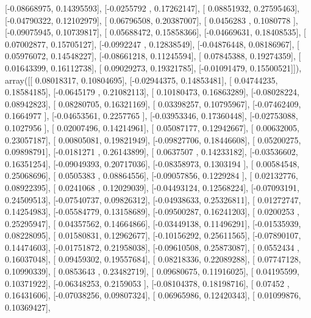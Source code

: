 \documentclass{article}
\begin{document}
       [-0.08668975,  0.14395593],
       [-0.0255792 ,  0.17262147],
       [ 0.08851932,  0.27595463],
       [-0.04790322,  0.12102979],
       [ 0.06796508,  0.20387007],
       [ 0.0456283 ,  0.1080778 ],
       [-0.09075945,  0.10739817],
       [ 0.05688472,  0.15858366],
       [-0.04669631,  0.18408535],
       [ 0.07002877,  0.15705127],
       [-0.0992247 ,  0.12838549],
       [-0.04876448,  0.08186967],
       [ 0.05976072,  0.14548227],
       [-0.08661218,  0.11245594],
       [ 0.07845388,  0.19274359],
       [ 0.01643399,  0.16112738],
       [ 0.09029273,  0.19321785],
       [-0.01091479,  0.15500521]]), array([[ 0.08018317,  0.10804695],
       [-0.02944375,  0.14853481],
       [ 0.04744235,  0.18584185],
       [-0.0645179 ,  0.21082113],
       [ 0.10180473,  0.16863289],
       [-0.08028224,  0.08942823],
       [ 0.08280705,  0.16321169],
       [ 0.03398257,  0.10795967],
       [-0.07462409,  0.1664977 ],
       [-0.04653561,  0.2257765 ],
       [-0.03953346,  0.17360448],
       [-0.02753088,  0.1027956 ],
       [ 0.02007496,  0.14214961],
       [ 0.05087177,  0.12942667],
       [ 0.00632005,  0.23057187],
       [ 0.00805081,  0.19821949],
       [-0.09827706,  0.18446608],
       [ 0.05200275,  0.09898791],
       [-0.0181271 ,  0.26143899],
       [ 0.0637507 ,  0.14233182],
       [-0.03536602,  0.16351254],
       [-0.09049393,  0.20717036],
       [-0.08358973,  0.1303194 ],
       [ 0.00584548,  0.25068696],
       [ 0.0505383 ,  0.08864556],
       [-0.09057856,  0.1229284 ],
       [ 0.02132776,  0.08922395],
       [ 0.0241068 ,  0.12029039],
       [-0.04493124,  0.12568224],
       [-0.07093191,  0.24509513],
       [-0.07540737,  0.09826312],
       [-0.04938633,  0.25326811],
       [ 0.01272747,  0.14254983],
       [-0.05584779,  0.13158689],
       [-0.09500287,  0.16241203],
       [ 0.0200253 ,  0.25295947],
       [ 0.04357562,  0.14664866],
       [-0.03449138,  0.11496291],
       [-0.01535939,  0.08228095],
       [ 0.01580831,  0.12962677],
       [-0.10156292,  0.25611565],
       [-0.07890107,  0.14474603],
       [-0.01751872,  0.21958038],
       [-0.09610508,  0.25873087],
       [ 0.0552434 ,  0.16037048],
       [ 0.09459302,  0.19557684],
       [ 0.08218336,  0.22089288],
       [ 0.07747128,  0.10990339],
       [ 0.0853643 ,  0.23482719],
       [ 0.09680675,  0.11916025],
       [ 0.04195599,  0.10371922],
       [-0.06348253,  0.2159053 ],
       [-0.08104378,  0.18198716],
       [ 0.07452   ,  0.16431606],
       [-0.07038256,  0.09807324],
       [ 0.06965986,  0.12420343],
       [ 0.01099876,  0.10369427],
\end{document}
